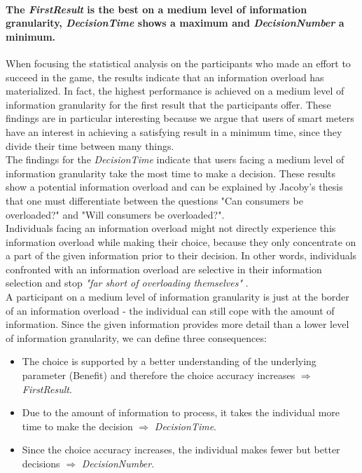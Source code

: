 \paragraph{The \textit{FirstResult} is the best on a medium level of information granularity, \textit{DecisionTime} shows a maximum and \textit{DecisionNumber} a minimum.}
When focusing the statistical analysis on the participants who made an effort to succeed in the game, the results indicate that an information overload has materialized. In fact, the highest performance is achieved on a medium level of information granularity for the first result that the participants offer. These findings are in particular interesting because we argue that users of smart meters have an interest in achieving a satisfying result in a minimum time, since they divide their time between many things.\\
The findings for the \textit{DecisionTime} indicate that users facing a medium level of information granularity take the most time to make a decision. These results show a potential information overload and can be explained by Jacoby's thesis that one must differentiate between the questions "Can consumers be overloaded?" and "Will consumers be overloaded?".\\ 
Individuals facing an information overload might not directly experience this information overload while making their choice, because they only concentrate on a part of the given information prior to their decision. In other words, individuals confronted with an information overload are selective in their information selection and stop \textit{"far short of overloading themselves"} \citep{Jacoby1984}.\\
A participant on a medium level of information granularity is just at the border of an information overload - the individual can still cope with the amount of information. Since the given information provides more detail than a lower level of information granularity, we can define three consequences:
\begin{itemize}
\item The choice is supported by a better understanding of the underlying parameter (Benefit) and therefore the choice accuracy increases $\Rightarrow$ \textit{FirstResult}.
\item Due to the amount of information to process, it takes the individual more time to make the decision $\Rightarrow$ \textit{DecisionTime}.
\item Since the choice accuracy increases, the individual makes fewer but better decisions $\Rightarrow$ \textit{DecisionNumber}.
\end{itemize}

